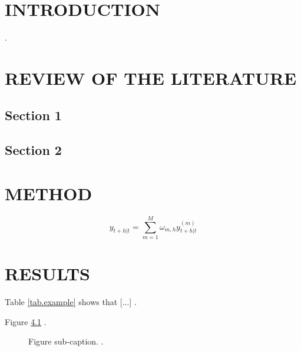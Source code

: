 \documentclass[12pt]{report}
\begin{document}
\begin{mainf} %
\chapter{INTRODUCTION}

\lipsum[2] \citep{welch2008comprehensive}.

 
\chapter{REVIEW OF THE LITERATURE}

\lipsum[1] 

\section{Section 1}

\lipsum[2]

\section{Section 2}

\lipsum[5]

\chapter{METHOD}

\lipsum[1] 

\begin{equation}
     y_{t+h|t} = \sum_{m=1}^M{\omega_{m,h}y_{t+h|t}^{(m)}}
\end{equation}

\lipsum[2] 


\chapter{RESULTS}

Table \ref{tab.example} shows that [...] \lipsum[1]. 



Figure \ref{fig.example} \lipsum[2-3]. 

\begin{figure}%
    \centering
    \caption{Figure Title}
	\label{fig.example}
	
	\caption*{\small Figure sub-caption. \lipsum[1].}
\end{figure}


\end{mainf}
\end{document}
